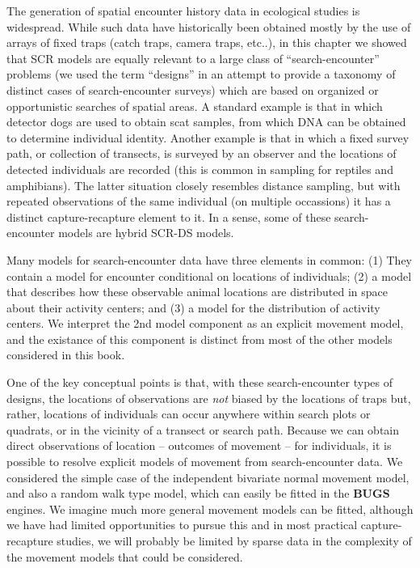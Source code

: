 The generation of spatial encounter history data in ecological studies
is widespread. While such data have historically been obtained mostly
by the use of arrays of fixed traps (catch traps, camera traps,
etc..), in this chapter we showed that SCR models are equally relevant
to a large class of ``search-encounter'' problems (we used the term
``designs'' in an attempt to provide a taxonomy of distinct cases of
search-encounter surveys) which are based on organized or
opportunistic searches of spatial areas. A standard example is that in
which detector dogs are used to obtain scat samples, from which DNA
can be obtained to determine individual identity.  Another example is
that in which a fixed survey path, or collection of transects, is
surveyed by an observer and the locations of detected individuals are
recorded (this is common in sampling for reptiles and amphibians). 
The latter situation closely resembles distance sampling,
but with repeated observations of the same individual (on multiple
occassions) it has a distinct capture-recapture element to it. In a
sense, some of these search-encounter models are hybrid SCR-DS models.

Many models for search-encounter data have three elements in common:
(1) They contain a model for encounter conditional on locations of
individuals; (2) a model that describes how these observable animal
locations are distributed in space about their activity centers; and
(3) a model for the distribution of activity centers.  We interpret
the 2nd model component as an explicit movement model, and the
existance of this component is distinct from most of the other models
considered in this book.

One of the key conceptual points is that, with these search-encounter
types of designs, the locations of observations are {\it not} biased
by the locations of traps but, rather, locations of individuals can
occur anywhere within search plots or quadrats, or in the vicinity of
a transect or search path.  Because we can obtain direct observations
of location -- outcomes of movement -- for individuals, it is possible
to resolve explicit models of movement from search-encounter data.  We
considered the simple case of the independent bivariate normal
movement model, and also a random walk type model, which can easily be
fitted in the {\bf BUGS} engines.  We imagine much more general
movement models can be fitted, although we have had limited
opportunities to pursue this and in most practical capture-recapture
studies, we will probably be limited by sparse data in the complexity
of the movement models that could be considered.

